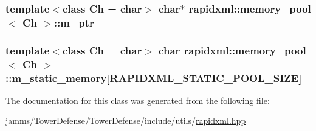 \hypertarget{classrapidxml_1_1memory__pool_a4a89ff677c72afc163d1855cefc28013}{
\subsubsection[{m\+\_\+ptr}]{\setlength{\rightskip}{0pt plus 5cm}template$<$class Ch  = char$>$ char$\ast$ {\bf rapidxml\+::memory\+\_\+pool}$<$ Ch $>$\+::m\+\_\+ptr\hspace{0.3cm}{\ttfamily [private]}}}\label{classrapidxml_1_1memory__pool_a4a89ff677c72afc163d1855cefc28013}
\hypertarget{classrapidxml_1_1memory__pool_aacc5ca734ebfbef7f42251764eb396f4}{
\subsubsection[{m\+\_\+static\+\_\+memory}]{\setlength{\rightskip}{0pt plus 5cm}template$<$class Ch  = char$>$ char {\bf rapidxml\+::memory\+\_\+pool}$<$ Ch $>$\+::m\+\_\+static\+\_\+memory\mbox{[}{\bf R\+A\+P\+I\+D\+X\+M\+L\+\_\+\+S\+T\+A\+T\+I\+C\+\_\+\+P\+O\+O\+L\+\_\+\+S\+I\+Z\+E}\mbox{]}\hspace{0.3cm}{\ttfamily [private]}}}\label{classrapidxml_1_1memory__pool_aacc5ca734ebfbef7f42251764eb396f4}


The documentation for this class was generated from the following file\+:\begin{DoxyCompactItemize}
\item 
jamms/\+Tower\+Defense/\+Tower\+Defense/include/utils/\hyperlink{rapidxml_8hpp}{rapidxml.\+hpp}\end{DoxyCompactItemize}
